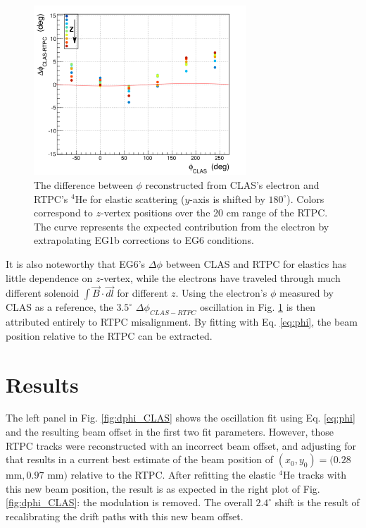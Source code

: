 \documentclass[amsmath,amssymb,notitlepage,12pt]{revtex4-1}
\begin{document}
\begin{figure}[hbtp]\centering
    \includegraphics[width=8cm]{pics/dphi_z_v9_plus_bosted}
    \caption{The difference between $\phi$ reconstructed from CLAS's electron and RTPC's $^4$He for elastic scattering ($y$-axis is shifted by $180^\circ$).  Colors correspond to $z$-vertex positions over the 20 cm range of the RTPC.  The curve represents the expected contribution from the electron by extrapolating EG1b corrections to EG6 conditions.\label{fig:dphi_vs_z}}
\end{figure}
It is also noteworthy that EG6's $\Delta\phi$ between CLAS and RTPC for elastics has little dependence on $z$-vertex, while the electrons have traveled through much different solenoid $\int\vec{B}\cdot \vec{dl}$ for different $z$.
Using the electron's $\phi$ measured by CLAS as a reference, the $3.5^\circ$ $\Delta\phi_{CLAS-RTPC}$ oscillation in Fig. \ref{fig:dphi_vs_z} is then attributed entirely to RTPC misalignment.  By fitting with Eq. \ref{eq:phi}, the beam position relative to the RTPC can be extracted.


\section{Results}

The left panel in Fig. \ref{fig:dphi_CLAS} shows the oscillation fit using Eq. \ref{eq:phi} and the resulting beam offset in the first two fit parameters.  However, those RTPC tracks were reconstructed with an incorrect beam offset, and adjusting for that results in a current best estimate of the beam position of $(x_0,y_0)=(0.28$ mm$,0.97$ mm$)$ relative to the RTPC.  
After refitting the elastic $^4$He tracks with this new beam position, the result is as expected in the right plot of Fig. \ref{fig:dphi_CLAS}:  the modulation is removed.  The overall $2.4^\circ$ shift is the result of recalibrating the drift paths with this new beam offset.
\end{document}
